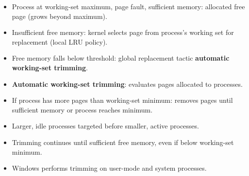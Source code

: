 \begin{itemize}
    \item Process at working-set maximum, page fault, sufficient memory: allocated free page (grows beyond maximum).
    \item Insufficient free memory: kernel selects page from process's working set for replacement (local LRU policy).
    \item Free memory falls below threshold: global replacement tactic \textbf{automatic working-set trimming}.
    \item \textbf{Automatic working-set trimming}: evaluates pages allocated to processes.
    \item If process has more pages than working-set minimum: removes pages until sufficient memory or process reaches minimum.
    \item Larger, idle processes targeted before smaller, active processes.
    \item Trimming continues until sufficient free memory, even if below working-set minimum.
    \item Windows performs trimming on user-mode and system processes.
\end{itemize}

